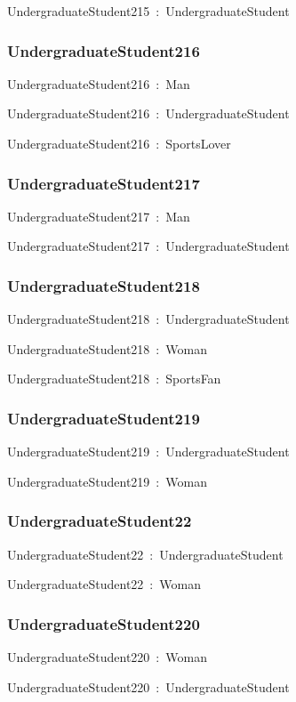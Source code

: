 \documentclass{article}
\begin{document}
UndergraduateStudent215~:~UndergraduateStudent

\subsubsection*{UndergraduateStudent216}

UndergraduateStudent216~:~Man

UndergraduateStudent216~:~UndergraduateStudent

UndergraduateStudent216~:~SportsLover

\subsubsection*{UndergraduateStudent217}

UndergraduateStudent217~:~Man

UndergraduateStudent217~:~UndergraduateStudent

\subsubsection*{UndergraduateStudent218}

UndergraduateStudent218~:~UndergraduateStudent

UndergraduateStudent218~:~Woman

UndergraduateStudent218~:~SportsFan

\subsubsection*{UndergraduateStudent219}

UndergraduateStudent219~:~UndergraduateStudent

UndergraduateStudent219~:~Woman

\subsubsection*{UndergraduateStudent22}

UndergraduateStudent22~:~UndergraduateStudent

UndergraduateStudent22~:~Woman

\subsubsection*{UndergraduateStudent220}

UndergraduateStudent220~:~Woman

UndergraduateStudent220~:~UndergraduateStudent
\end{document}
